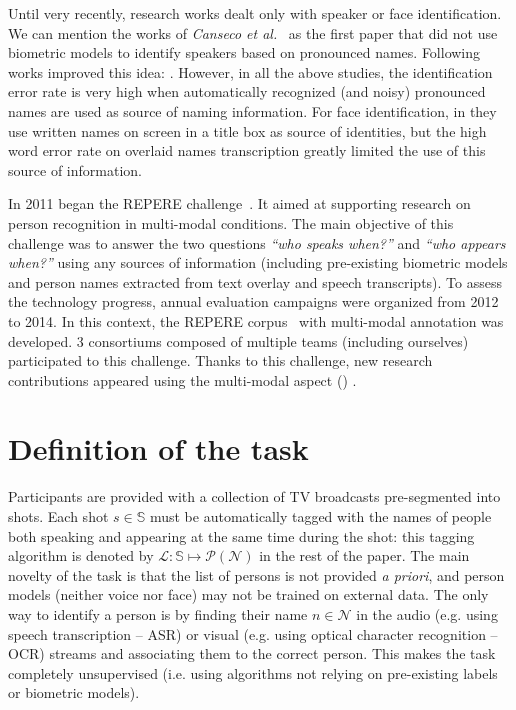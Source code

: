 \documentclass{acm_proc_article-me}
\newcommand\shots{\mathbb{S}}
\newcommand\hypLabels{\mathcal{L}}
\newcommand\hypNames{\mathcal{N}}
\begin{document}
Until very recently, research works dealt only with speaker or face identification. We can mention the works of \textit{Canseco et al.}~\cite{CANSECO--ASRU--2005, CANSECO--INTERSPEECH--2004} as the first paper that did not use biometric models to identify speakers based on pronounced names. Following works improved this idea: \cite{ESTEVE--INTERSPEECH--2007, JOUSSE--ICCASP--2009, MAUCLAIR--Odyssey--2006, TRANTER--ICASSP--2006}. However, in all the above studies, the identification error rate is very high when automatically recognized (and noisy) pronounced names are used as source of naming information. For face identification, in \cite{HOUGHTON--IS--1999, SATOH--IEEEMM--1999, YANG--ACMMM--2004, YANG--ACMMM--2005} they use written names on screen in a title box as source of identities, but the high word error rate on overlaid names transcription greatly limited the use of this source of information.

In 2011 began the REPERE challenge~\cite{BERNARD--SLAM--2013, KAHN--CBMI--2012}. It aimed at supporting research on person recognition in multi-modal conditions. The main objective of this challenge was to answer the two questions \emph{``who speaks when?''} and \emph{``who appears when?''} using any sources of information (including pre-existing biometric models and person names extracted from text overlay and speech transcripts). To assess the technology progress, annual evaluation campaigns were organized from 2012 to 2014. In this context, the REPERE corpus~\cite{GIRAUDEL--LREC--2012} with multi-modal annotation was developed. 3 consortiums composed of multiple teams (including ourselves) participated to this challenge. Thanks to this challenge, new research contributions appeared using the multi-modal aspect (\cite{BECHET--INTERSPEECH--2014, BENDRIS--CBMI--2013, BREDIN--ODYSSEY--2014, BREDIN--INTERSPEECH--2013, BREDIN--SLAM--2013, BREDIN--IJMIR--2014, FAVRE--SLAM--2013, GAY--CBMI--2014, POIGNANT--ASLP--2015, POIGNANT--SLAM--2013, POIGNANT--INTERSPEECH--2012, POIGNANT--MTAP--2015, ROUVIER--CBMI--2014})  .

\section{Definition of the task}

Participants are provided with a collection of TV broadcasts pre-segmented into shots.
Each shot $s \in \shots$ must be automatically tagged with the names of people both speaking and appearing at the same time during the shot: this tagging algorithm is denoted by $\hypLabels : \shots \mapsto \mathcal{P}(\hypNames)$ in the rest of the paper.
The main novelty of the task is that the list of persons is not provided \emph{a priori}, and person models (neither voice nor face) may not be trained on external data. The only way to identify a person is by finding their name $n \in \hypNames$ in the audio (e.g. using speech transcription -- ASR) or visual (e.g. using optical character recognition -- OCR) streams and associating them to the correct person. This makes the task completely unsupervised (i.e. using algorithms not relying on pre-existing labels or biometric models).
\end{document}
